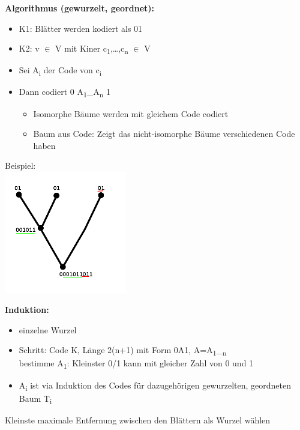 \textbf{Algorithmus (gewurzelt, geordnet):}\newline
\begin{itemize}
	\item K1: Blätter werden kodiert als 01
	\item K2: v $\in$ V mit Kiner c\textsubscript{1},\ldots,c\textsubscript{n} $\in$ V
	\item Sei A\textsubscript{i} der Code von c\textsubscript{i}
	\item Dann codiert 0 A\textsubscript{1}\_A\textsubscript{n} 1
	\begin{itemize}
		\item Isomorphe Bäume werden mit gleichem Code codiert
		\item Baum aus Code: Zeigt das nicht-isomorphe Bäume verschiedenen Code haben
	\end{itemize}
\end{itemize}
Beispiel:\\
\includegraphics[width=0.4\textwidth]{lectures/161028/pix/isomorph.png}
\newpage

\textbf{Induktion:}\newline
\begin{itemize}
	\item einzelne Wurzel \grqq{}
	\item Schritt: Code K, Länge 2(n+1) mit Form 0A1, A=A\textsubscript{1}\_\textsubscript{n}\\
bestimme A\textsubscript{1}: Kleinster 0/1 kann mit gleicher Zahl von 0 und 1\newline
	\item A\textsubscript{i} ist via Induktion des Codes für dazugehörigen gewurzelten, geordneten Baum T\textsubscript{i}
\end{itemize}

\glq Kleinste maximale Entfernung zwischen den Blättern als Wurzel wählen \grqq{}